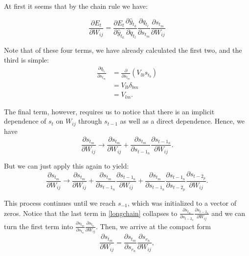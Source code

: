 \documentclass[11pt,twoside]{article}
\begin{document}
\noindent At first it seems that by the chain rule we have:

\begin{equation}
\frac{\partial E_t}{\partial W_{ij}}=\frac{\partial E_t}{\partial \hat{y}_{t_k}}\frac{\partial \hat{y}_{t_k}}{\partial q_{t_l}}\frac{\partial q_{t_l}}{\partial s_{t_m}}\frac{\partial s_{t_m}}{\partial W_{ij}}
\end{equation}

\noindent Note that of these four terms, we have already calculated the first two, and the third is simple:
\begin{subequations}
\begin{align}
\frac{\partial q_{t_l}}{\partial s_{t_m}} &= \frac{\partial }{\partial s_{t_m}}\left(V_{lb}s_{t_b}\right) \\
&= V_{lb}\delta_{bm} \\
&= V_{lm}.
\end{align}
\end{subequations}

\noindent The final term, however, requires us to notice that there is an implicit dependence of $s_t$ on $W_{ij}$ through $s_{t-1}$ as well as a direct dependence. Hence, we have
\begin{equation}
\frac{\partial s_{t_m}}{\partial W_{ij}} \rightarrow \frac{\partial s_{t_m}}{\partial W_{ij}}+\frac{\partial s_{t_m}}{\partial s_{{t-1}_n}}\frac{\partial s_{{t-1}_n}}{\partial W_{ij}}.
\end{equation}

\noindent But we can just apply this again to yield:
\begin{equation}
\label{longchain}
\frac{\partial s_{t_m}}{\partial W_{ij}} \rightarrow \frac{\partial s_{t_m}}{\partial W_{ij}}
	+\frac{\partial s_{t_m}}{\partial s_{{t-1}_n}}\frac{\partial s_{{t-1}_n}}{\partial W_{ij}}
	+\frac{\partial s_{t_m}}{\partial s_{{t-1}_n}}\frac{\partial s_{{t-1}_n}}{\partial s_{{t-2}_p}}\frac{\partial s_{{t-2}_p}}{\partial W_{ij}}.
\end{equation}

\noindent This process continues until we reach $s_{-1}$, which was initialized to a vector of zeros. Notice that the last term in \eqref{longchain} collapses to $\frac{\partial s_{t_m}}{\partial s_{{t-2}_n}}\frac{\partial s_{{t-2}_n}}{\partial W_{ij}}$ and we can turn the first term into $\frac{\partial s_{t_m}}{\partial s_{t_n}}\frac{\partial s_{t_n}}{\partial W_{ij}}$. Then, we arrive at the compact form
\begin{equation}
\frac{\partial s_{t_m}}{\partial W_{ij}}=\frac{\partial s_{t_m}}{\partial s_{r_n}}\frac{\partial s_{r_n}}{\partial W_{ij}},
\end{equation}
\end{document}
